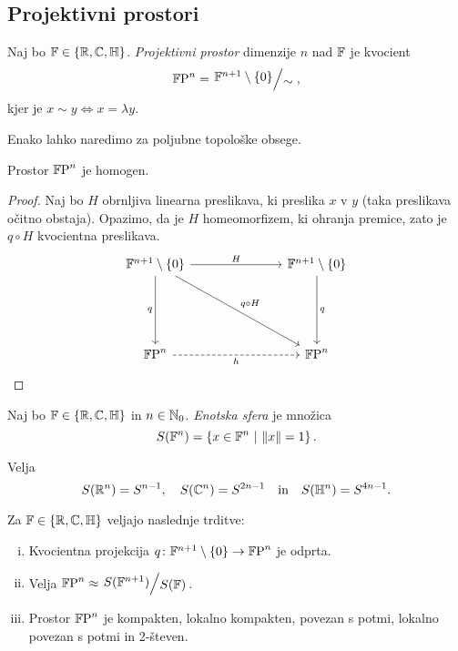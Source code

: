 \newpage

\subsection{Projektivni prostori}


\begin{definicija}
Naj bo $\mathbb{F} \in \left\{\mathbb{R}, \mathbb{C}, \mathbb{H}\right\}$.
\emph{Projektivni prostor}
dimenzije $n$ nad $\mathbb{F}$ je kvocient
\[
\proj{\F}{n} = \kvoc{\F^{n+1} \setminus \set{0}}{\sim},
\]
kjer je $x \sim y \iff x = \lambda y$.
\end{definicija}

\begin{opomba}
Enako lahko naredimo za poljubne topološke obsege.
\end{opomba}

\begin{trditev}
Prostor $\mathbb{F}\!\operatorname{P}^{n}$ je homogen.
\end{trditev}

\begin{proof}
Naj bo $H$ obrnljiva linearna preslikava, ki preslika $x$ v $y$
(taka preslikava očitno obstaja). Opazimo, da je $H$ homeomorfizem,
ki ohranja premice, zato je $q \circ H$ kvocientna preslikava.
\[
\begin{tikzcd}[column sep=large, row sep=large]
\F^{n+1} \setminus \set{0}
\arrow[rr, "H"]
\arrow[dd, "q"']
\arrow[ddrr, "q \circ H"]
&& \F^{n+1} \setminus \set{0}
\arrow[dd, "q"] \\\\
\proj{\F}{n} \arrow[rr, dashrightarrow, "h"']
&& \proj{\F}{n}
\end{tikzcd} \qedhere
\]
\end{proof}

\begin{definicija}
Naj bo $\mathbb{F} \in \left\{\mathbb{R}, \mathbb{C}, \mathbb{H}\right\}$ in $n \in \mathbb{N}_0$.
\emph{Enotska sfera} je množica
\[
S(\mathbb{F}^n) = \left\{x \in \mathbb{F}^n~\middle\vert~\left\lVert x\right\rVert = 1\right\}.
\]
\end{definicija}

\begin{opomba}
Velja
\[
S(\mathbb{R}^n) = S^{n-1}, \quad
S(\mathbb{C}^n) = S^{2n - 1}
\quad \text{in} \quad
S(\mathbb{H}^n) = S^{4n - 1}.
\]
\end{opomba}

\begin{trditev}
Za $\mathbb{F} \in \left\{\mathbb{R}, \mathbb{C}, \mathbb{H}\right\}$ veljajo naslednje trditve:

\begin{enumerate}[i)]
\item Kvocientna projekcija
$q \colon \mathbb{F}^{n+1} \setminus \left\{0\right\} \to \mathbb{F}\!\operatorname{P}^{n}$ je odprta.
\item Velja $\proj{\F}{n} \approx \kvoc{S(\F^{n+1})}{S(\F)}$.
\item Prostor $\mathbb{F}\!\operatorname{P}^{n}$ je kompakten, lokalno kompakten,
povezan s potmi, lokalno povezan s potmi in 2-števen.

\end{enumerate}
\end{trditev}

